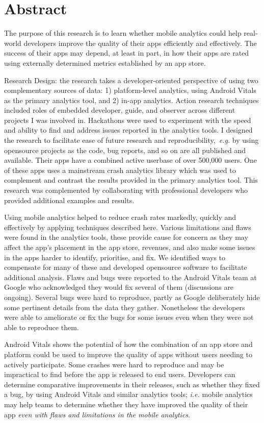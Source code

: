 \chapter*{Abstract}
\begin{SingleSpace}

The purpose of this research is to learn whether mobile analytics could help
real-world developers improve the quality of their apps efficiently and effectively. The success of their apps may depend, at least in part, in how their apps are rated using externally determined metrics established by an app store.

Research Design: the research takes a developer-oriented perspective of using two complementary sources of data: 1) platform-level analytics, using Android Vitals as the primary analytics tool, and 2) in-app analytics.
%
Action research techniques included roles of embedded developer, guide, and observer across different projects I was involved in. Hackathons were used to experiment with the speed and ability to find and address issues reported in the analytics tools. 
%
I designed the research to facilitate ease of future research and reproducibility,~\emph{e.g.} by using  opensource projects as the code, bug reports, and so on are all published and available. Their apps have a combined active userbase of over 500,000 users. One of these apps uses a mainstream crash analytics library which was used to complement and contrast the results provided in the primary analytics tool.
%
This research was complemented by collaborating with professional developers who provided additional examples and results.

Using mobile analytics helped to reduce crash rates markedly, quickly and effectively by applying techniques described here.
Various limitations and flaws were found in the analytics tools, these provide cause for concern as they may affect the app's placement in the app store, revenues, and also make some issues in the apps harder to identify, prioritise, and fix. We identified ways to compensate for many of these and developed opensource software to facilitate additional analysis. Flaws and bugs were reported to the Android Vitals team at Google who acknowledged they would fix several of them (discussions are ongoing).
%
Several bugs were hard to reproduce, partly as Google deliberately hide some pertinent details from the data they gather. Nonetheless the developers were able to ameliorate or fix the bugs for some issues even when they were not able to reproduce them. 

Android Vitals shows the potential of how the combination of an app store and platform could be used to improve the quality of apps without users needing to actively participate. Some crashes were hard to reproduce and may be impractical to find before the app is released to end users. Developers can determine comparative improvements in their releases, such as whether they fixed a bug, by using Android Vitals and similar analytics tools; \textit{i.e.} mobile analytics may help teams to determine whether they have improved the quality of their app \textit{even with flaws and limitations in the mobile analytics}.
\end{SingleSpace}
\newpage
